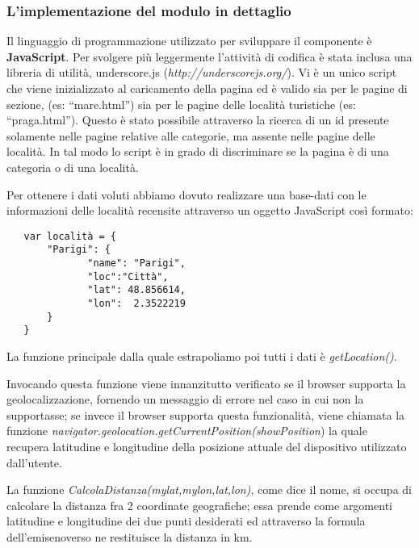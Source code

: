 \subsubsection{L'implementazione del modulo in dettaglio}

Il linguaggio di programmazione utilizzato per sviluppare il componente è \textbf{JavaScript}. Per svolgere più leggermente l'attività di codifica è stata inclusa una libreria di utilità, underscore.js (\textit{http://underscorejs.org/}).
Vi è un unico script che viene inizializzato al caricamento della pagina ed è valido sia per le pagine di sezione, (es: “mare.html”) sia per le pagine delle località turistiche (es: “praga.html”).
Questo è stato possibile attraverso la ricerca di un id presente solamente nelle pagine relative alle categorie, ma assente nelle pagine delle località. In tal modo lo script è in grado di discriminare se la pagina è di una categoria o di una località.

\begin{flushleft}
Per ottenere i dati voluti abbiamo dovuto realizzare una base-dati con le informazioni delle località recensite attraverso un oggetto JavaScript così formato:
\end{flushleft}
\begin{verbatim}
   var località = {
       "Parigi": {
	          "name": "Parigi",
	          "loc":"Città",
	          "lat": 48.856614,
	          "lon":  2.3522219
       }
   }
\end{verbatim}
\begin{flushleft}
La funzione principale dalla quale estrapoliamo poi tutti i dati è \textit{getLocation()}.

Invocando questa funzione viene innanzitutto verificato se il browser supporta la geolocalizzazione, fornendo un messaggio di errore nel caso in cui non la supportasse; se invece il browser supporta questa funzionalità, viene chiamata la funzione \textit{navigator.geolocation.getCurrentPosition(showPosition}) la quale recupera latitudine e longitudine della posizione attuale del dispositivo utilizzato dall'utente.
\end{flushleft}
\begin{flushleft}
La funzione \textit{CalcolaDistanza(mylat,mylon,lat,lon)}, come dice il nome, si occupa di calcolare la distanza fra 2 coordinate geografiche; essa prende come argomenti latitudine e longitudine dei due punti desiderati ed attraverso la formula dell'emisenoverso ne restituisce la distanza in km.
\end{flushleft}

